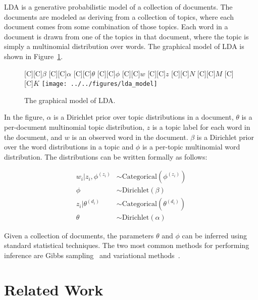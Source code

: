 \documentclass[ms]{byuprop}
\newcommand{\figref}[1]{Figure~\ref{fig:#1}}
\begin{document}
LDA is a generative probabilistic model of a collection of documents.  The
documents are modeled as deriving from a collection of topics, where each
document comes from some combination of those topics.  Each word in a
document is drawn from one of the topics in that document, where the topic is
simply a multinomial distribution over words.  The graphical model of LDA is
shown in \figref{lda}.

\begin{figure}
  \centering
  [C][C]{\Large$\beta$}
  [C][C]{\Large$\alpha$}
  [C][C]{\Large$\theta$}
  [C][C]{\Large$\phi$}
  [C][C]{\Large$w$}
  [C][C]{\Large$z$}
  [C][C]{\large$N$}
  [C][C]{\large$M$}
  [C][C]{\large$K$}
  \texttt{[image: ../../figures/lda\_model]}
  \caption{The graphical model of LDA.}
  \label{fig:lda}
\end{figure}

In the figure, $\alpha$ is a Dirichlet prior over topic distributions in a
document, $\theta$ is a per-document multinomial topic distribution, $z$ is a
topic label for each word in the document, and $w$ is an observed word in the
document.  $\beta$ is a Dirichlet prior over the word distributions in a topic
and $\phi$ is a per-topic multinomial word distribution.  The distributions can
be written formally as follows:

\begin{align*} 
  w_i|z_i,\phi^{(z_i)} &\sim \mathrm{Categorical}(\phi^{(z_i)}) \\
  \phi &\sim \mathrm{Dirichlet}(\beta) \\
  z_i|\theta^{(d_i)} &\sim \mathrm{Categorical}(\theta^{(d_i)}) \\ 
  \theta &\sim \mathrm{Dirichlet}(\alpha) 
\end{align*}

Given a collection of documents, the parameters $\theta$ and $\phi$ can be
inferred using standard statistical techniques.  The two most common methods
for performing inference are Gibbs
sampling~\cite{griffiths-2004-finding-scientific-topics} and variational
methods~\cite{blei-2003-latent-dirichlet-allocation}.



\section{Related Work}
\end{document}
